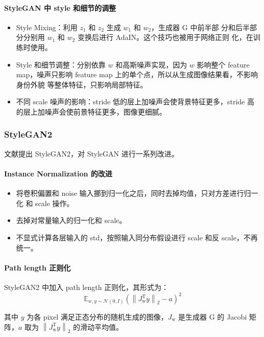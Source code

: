 \paragraph{StyleGAN 中 style 和细节的调整}
\begin{itemize}
  \item Style Mixing：利用 $z_1$ 和 $z_2$ 生成 $w_1$ 和 $w_2$，生成器 G 中前半部
    分和后半部分分别用 $w_1$ 和 $w_2$ 变换后进行 AdaIN。这个技巧也被用于网络正则
    化，在训练时使用。
  \item Style 和细节调整：分别依靠 $w$ 和高斯噪声实现，因为 $w$ 影响整个 feature
    map，噪声只影响 feature map 上的单个点，所以从生成图像结果看，不影响身份外貌
    等整体特征，只影响局部特征。
  \item 不同 scale 噪声的影响：stride 低的层上加噪声会使背景特征更多，stride 高
    的层上加噪声会使前景特征更多，图像更细腻。
\end{itemize}

\subsubsection{StyleGAN2}
文献提出 StyleGAN2，对 StyleGAN 进行一系列改进。

\paragraph{Instance Normalization 的改进}
\begin{itemize}
  \item 将卷积偏置和 noise 输入挪到归一化之后，同时去掉均值，只对方差进行归一化
    和 scale 操作。
  \item 去掉对常量输入的归一化和 scale。
  \item 不显式计算各层输入的 std，按照输入同分布假设进行 scale 和反 scale，不再
    统一。
\end{itemize}

\paragraph{Path length 正则化}
StyleGAN2 中加入 path length 正则化，其形式为：
\begin{equation}
  \mathbb{E}_{w,y \sim \mathcal{N}(0, I)} {\left( \left \lVert J_{\mathrm{w}}^{\mathrm{T}} y \right \rVert _ 2 - a \right)} ^ 2
\end{equation}

其中 $y$ 为各 pixel 满足正态分布的随机生成的图像，$J_{\mathrm{w}}$ 是生成器 G 的
Jacobi 矩阵，$a$ 取为 $\left \lVert J_{\mathrm{w}}^{\mathrm{T}} y \right \rVert
_ 2$ 的滑动平均值。

